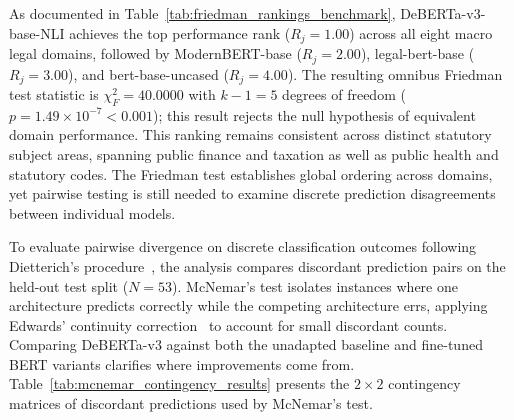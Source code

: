 As documented in Table~\ref{tab:friedman_rankings_benchmark}, DeBERTa-v3-base-NLI achieves the top performance rank ($R_j = 1.00$) across all eight macro legal domains, followed by ModernBERT-base ($R_j = 2.00$), legal-bert-base ($R_j = 3.00$), and bert-base-uncased ($R_j = 4.00$). The resulting omnibus Friedman test statistic is $\chi_F^2 = 40.0000$ with $k - 1 = 5$ degrees of freedom ($p = 1.49 \times 10^{-7} < 0.001$); this result rejects the null hypothesis of equivalent domain performance. This ranking remains consistent across distinct statutory subject areas, spanning public finance and taxation as well as public health and statutory codes. The Friedman test establishes global ordering across domains, yet pairwise testing is still needed to examine discrete prediction disagreements between individual models.

To evaluate pairwise divergence on discrete classification outcomes following Dietterich's procedure~\cite{dietterich1998approximate}, the analysis compares discordant prediction pairs on the held-out test split ($N = 53$). McNemar's test isolates instances where one architecture predicts correctly while the competing architecture errs, applying Edwards' continuity correction~\cite{mcnemar1947note, edwards1948note} to account for small discordant counts. Comparing DeBERTa-v3 against both the unadapted baseline and fine-tuned BERT variants clarifies where improvements come from. Table~\ref{tab:mcnemar_contingency_results} presents the $2 \times 2$ contingency matrices of discordant predictions used by McNemar's test.

